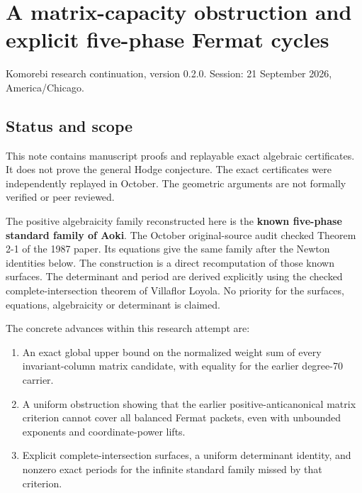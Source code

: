 \hypertarget{capacity_cycles-a-matrix-capacity-obstruction-and-explicit-five-phase-fermat-cycles}{%
\chapter{A matrix-capacity obstruction and explicit five-phase Fermat
cycles}\label{capacity_cycles-a-matrix-capacity-obstruction-and-explicit-five-phase-fermat-cycles}}

Komorebi research continuation, version 0.2.0. Session: 21 September
2026, America/Chicago.

\hypertarget{capacity_cycles-status-and-scope}{%
\section{Status and scope}\label{capacity_cycles-status-and-scope}}

This note contains manuscript proofs and replayable exact algebraic
certificates. It does not prove the general Hodge conjecture. The exact
certificates were independently replayed in October. The geometric
arguments are not formally verified or peer reviewed.

The positive algebraicity family reconstructed here is the \textbf{known
five-phase standard family of Aoki}. The October original-source audit
checked Theorem 2-1 of the 1987 paper. Its equations give the same
family after the Newton identities below. The construction is a direct
recomputation of those known surfaces. The determinant and period are
derived explicitly using the checked complete-intersection theorem of
Villaflor Loyola. No priority for the surfaces, equations, algebraicity
or determinant is claimed.

The concrete advances within this research attempt are:

\begin{enumerate}
\def\labelenumi{\arabic{enumi}.}
\tightlist
\item
  An exact global upper bound on the normalized weight sum of every
  invariant-column matrix candidate, with equality for the earlier
  degree-70 carrier.
\item
  A uniform obstruction showing that the earlier positive-anticanonical
  matrix criterion cannot cover all balanced Fermat packets, even with
  unbounded exponents and coordinate-power lifts.
\item
  Explicit complete-intersection surfaces, a uniform determinant
  identity, and nonzero exact periods for the infinite standard family
  missed by that criterion.
\end{enumerate}

